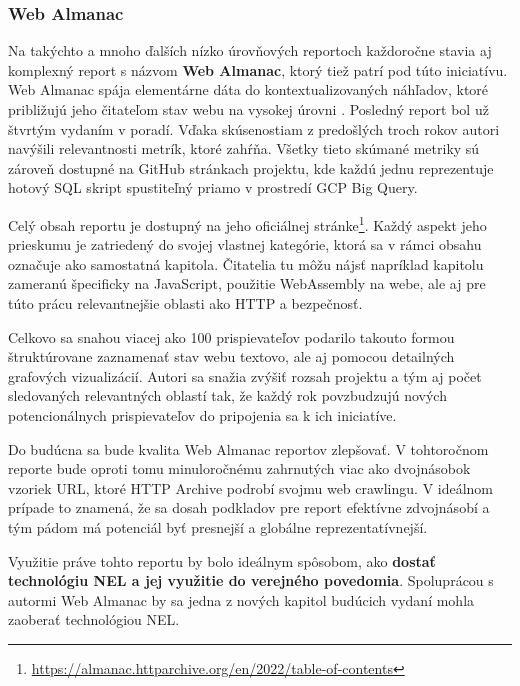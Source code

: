 \pagebreak

\subsubsection{Web Almanac}
\label{web-almanac}
Na takýchto a mnoho ďalších nízko úrovňových reportoch každoročne stavia aj komplexný report s názvom \textbf{Web Almanac}, ktorý tiež patrí pod túto iniciatívu.
Web Almanac spája elementárne dáta do kontextualizovaných náhľadov, ktoré približujú jeho čitateľom stav webu na vysokej úrovni \cite{httparchive-methodology}.
Posledný report bol už štvrtým vydaním v poradí.
Vďaka skúsenostiam z predošlých troch rokov autori navýšili relevantnosti metrík, ktoré zahŕňa. 
Všetky tieto skúmané metriky sú zároveň dostupné na GitHub stránkach projektu, kde každú jednu reprezentuje hotový SQL skript spustiteľný priamo v prostredí GCP Big Query.

Celý obsah reportu je dostupný na jeho oficiálnej stránke\footnote{\href{https://almanac.httparchive.org/en/2022/table-of-contents}{https://almanac.httparchive.org/en/2022/table-of-contents}}. 
Každý aspekt jeho prieskumu je zatriedený do svojej vlastnej kategórie, ktorá sa v rámci obsahu označuje ako samostatná kapitola.
Čitatelia tu môžu nájsť napríklad kapitolu zameranú špecificky na JavaScript, použitie WebAssembly na webe, ale aj pre túto prácu relevantnejšie oblasti ako HTTP a bezpečnosť.

Celkovo sa snahou viacej ako 100 prispievateľov podarilo takouto formou štruktúrovane zaznamenať stav webu textovo, ale aj pomocou detailných grafových vizualizácií.
Autori sa snažia zvýšiť rozsah projektu a tým aj počet sledovaných relevantných oblastí tak, že každý rok povzbudzujú nových potencionálnych prispievateľov do pripojenia sa k ich iniciatíve. 

Do budúcna sa bude kvalita Web Almanac reportov zlepšovať. 
V tohtoročnom reporte bude oproti tomu minuloročnému zahrnutých viac ako dvojnásobok vzoriek URL, 
ktoré HTTP Archive podrobí svojmu web crawlingu.
V ideálnom prípade to znamená, že sa dosah podkladov pre report efektívne zdvojnásobí a tým pádom má potenciál byť presnejší a globálne reprezentatívnejší.

Využitie práve tohto reportu by bolo ideálnym spôsobom, ako \textbf{dostať technológiu NEL a jej využitie do verejného povedomia}. 
Spoluprácou s autormi Web Almanac by sa jedna z nových kapitol budúcich vydaní mohla zaoberať technológiou NEL.


